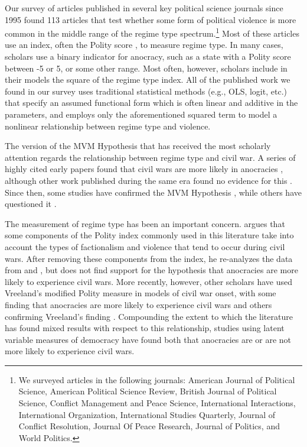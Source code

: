 \documentclass[titlepage, onecolumn,12pt]{article}
\begin{document}
Our survey of articles published in several key political science journals since 1995 found 113 articles that test whether some form of political violence is more common in the middle range of the regime type spectrum.\footnote{We surveyed articles in the following journals: American Journal of Political Science, American Political Science Review, British Journal of Political Science, Conflict Management and Peace Science, International Interactions, International Organization, International Studies Quarterly, Journal of Conflict Resolution, Journal Of Peace Research, Journal of Politics, and World Politics.} Most of these articles use an index, often the Polity score \citep{PolityIV}, to measure regime type. In many cases, scholars use a binary indicator for anocracy, such as a state with a Polity score between -5 or 5, or some other range. Most often, however, scholars include in their models the square of the regime type index. All of the published work we found in our survey uses traditional statistical methods (e.g., OLS, logit, etc.) that specify an assumed functional form which is often linear and additive in the parameters, and employs only the aforementioned squared term to model a nonlinear relationship between regime type and violence.

The version of the MVM Hypothesis that has received the most scholarly attention regards the relationship between regime type and civil war. A series of highly cited early papers found that civil wars are more likely in anocracies \citep{muller1990cross,ellingsen2000colorful,hegre2001toward,reynal2002ethnicity,fearon2003ethnicity}, although other work published during the same era found no evidence for this \citep{sambanis2001ethnic,elbadawi2002much}. Since then, some studies have confirmed the MVM Hypothesis \citep{smith2004oil,salehyan2006refugees,forsberg2008polarization,hartzell2010economic,warren2014not}, while others have questioned it \citep{carey2007rebellion,ostby2008polarization,cederman2010ethnic,jakobsen2013poor}.

The measurement of regime type has been an important concern. \citet{vreeland2008effect} argues that some components of the Polity index commonly used in this literature take into account the types of factionalism and violence that tend to occur during civil wars. After removing these components from the index, he re-analyzes the data from \citet{hegre2001toward} and \citet{fearon2003ethnicity}, but does not find support for the hypothesis that anocracies are more likely to experience civil wars. More recently, however, other scholars have used Vreeland's modified Polity measure in models of civil war onset, with some finding that anocracies are more likely to experience civil wars \citep{gleditsch2010political} and others confirming Vreeland's finding \citep{peic2011foreign,koubi2014grievances}. Compounding the extent to which the literature has found mixed results with respect to this relationship, studies using latent variable measures of democracy have found both that anocracies are \citep{gibler2014external} or are not \citep{treier2008democracy} more likely to experience civil wars.
\end{document}
